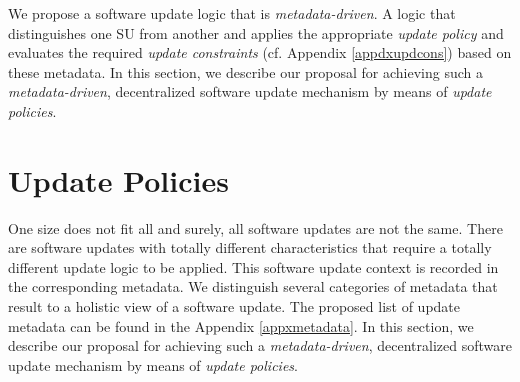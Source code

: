 {We propose a software update logic that is \emph{metadata-driven}. A logic that distinguishes one SU from another and applies the appropriate \emph{update policy} and evaluates the required \emph{update constraints} (cf. Appendix \ref{appdxupdcons}) based on these metadata. 
In this section, we describe our proposal for achieving such a \emph{metadata-driven}, decentralized software update mechanism by means of \emph{update policies}.


}

\section{Update Policies}
One size does not fit all and surely, all software updates are not the same. There are software updates with totally different characteristics that require a totally different update logic to be applied. This software update context is recorded in the corresponding metadata. We distinguish several categories of metadata that result to a holistic view of a software update. The proposed list of update metadata can be found in the Appendix \ref{appxmetadata}. In this section, we describe our proposal for achieving such a \emph{metadata-driven}, decentralized software update mechanism by means of \emph{update policies}. 

